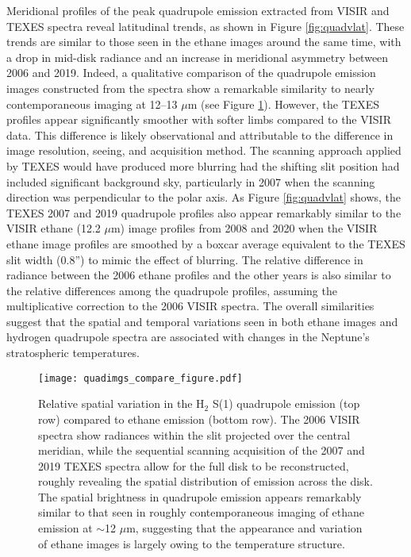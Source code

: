\documentclass[twocolumn,10pt]{aastex631}
\begin{document}
Meridional profiles of the peak quadrupole emission extracted from VISIR and TEXES spectra reveal latitudinal trends, as shown in Figure \ref{fig:quadvlat}.  These trends are similar to those seen in the ethane images around the same time, with a drop in mid-disk radiance and an increase in meridional asymmetry between 2006 and 2019. Indeed, a qualitative comparison of the quadrupole emission images constructed from the spectra show a remarkable similarity to nearly contemporaneous imaging at 12--13 $\mu$m (see Figure \ref{fig:quadethanesame}).  However, the TEXES profiles appear significantly smoother with softer limbs compared to the VISIR data.  This difference is likely observational and attributable to the difference in image resolution, seeing, and acquisition method. The scanning approach applied by TEXES would have produced more blurring had the shifting slit position had included significant background sky, particularly in 2007 when the scanning direction was perpendicular to the polar axis.  As Figure \ref{fig:quadvlat} shows, the TEXES 2007 and 2019 quadrupole profiles also appear remarkably similar to the VISIR ethane (12.2 $\mu$m) image profiles from 2008 and 2020 when the VISIR ethane image profiles are smoothed by a boxcar average equivalent to the TEXES slit width (0.8'') to mimic the effect of blurring. The relative difference in radiance between the 2006 ethane profiles and the other years is also similar to the relative differences among the quadrupole profiles, assuming the multiplicative correction to the 2006 VISIR spectra. The overall similarities suggest that the spatial and temporal variations seen in both ethane images and hydrogen quadrupole spectra are associated with changes in the Neptune's stratospheric temperatures.    

\begin{figure}[h]
    \centering
    \texttt{[image: quadimgs\_compare\_figure.pdf]}
    \caption{Relative spatial variation in the H$_2$ S(1) quadrupole emission (top row) compared to ethane emission (bottom row). The 2006 VISIR spectra show radiances within the slit projected over the central meridian, while the sequential scanning acquisition of the 2007 and 2019 TEXES spectra allow for the full disk to be reconstructed, roughly revealing the spatial distribution of emission across the disk. The spatial brightness in quadrupole emission appears remarkably similar to that seen in roughly contemporaneous imaging of ethane emission at $\sim$12 $\mu$m, suggesting that the appearance and variation of ethane images is largely owing to the temperature structure.}
    \label{fig:quadethanesame}
\end{figure}
\end{document}
